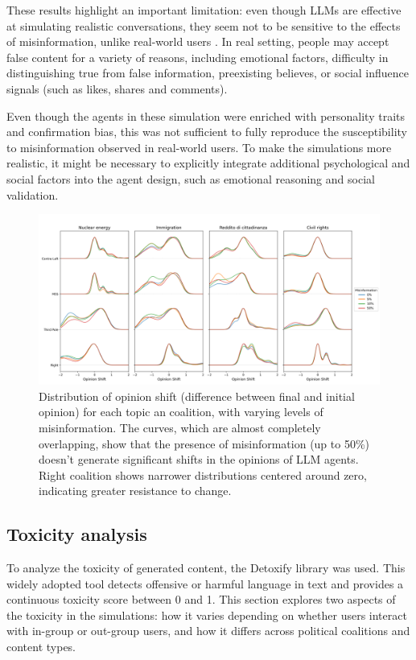 \medskip
These results highlight an important limitation: even though LLMs are effective at simulating realistic conversations, they seem not to be sensitive to the effects of misinformation, unlike real-world users \cite{aimeur2023fake}.
In real setting, people may accept false content for a variety of reasons, including emotional factors, difficulty in distinguishing true from false information, preexisting believes, or social influence signals (such as likes, shares and comments).

Even though the agents in these simulation were enriched with personality traits and confirmation bias, this was not sufficient to fully reproduce the susceptibility to misinformation observed in real-world users.
To make the simulations more realistic, it might be necessary to explicitly integrate additional psychological and social factors into the agent design, such as emotional reasoning and social validation.


\begin{figure}[h]
    \centering
    \includegraphics[width=0.8\linewidth]{Images/Misinformation/score_llm_RandomRecSys.png}
    \caption{
    Distribution of opinion shift (difference between final and initial opinion) for each topic an coalition, with varying levels of misinformation.
    The curves, which are almost completely overlapping, show that the presence of misinformation (up to 50\%) doesn't generate significant shifts in the opinions of LLM agents.
    Right coalition shows narrower distributions centered around zero, indicating greater resistance to change.
    }
    \label{fig:misinfo_opinion_shift}
\end{figure}


\subsection{Toxicity analysis}
To analyze the toxicity of generated content, the Detoxify library \cite{hanu2020detoxify} was used. This widely adopted tool detects offensive or harmful language in text and provides a continuous toxicity score between 0 and 1.
This section explores two aspects of the toxicity in the simulations: how it varies depending on whether users interact with in-group or out-group users, and how it differs across political coalitions and content types.

